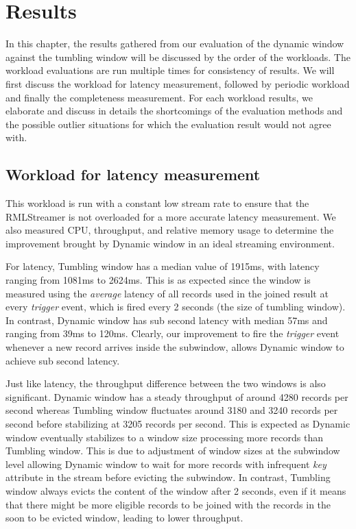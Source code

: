 \chapter{Results}%
\label{chap:Results}

In this chapter, the results gathered from our evaluation of the dynamic window against 
the tumbling window will be discussed by the order of the workloads. The workload 
evaluations are run multiple times for consistency of results. We will first 
discuss the workload for latency measurement, followed by periodic workload and 
finally the completeness measurement. For each workload results, we elaborate 
and discuss in details the shortcomings of the evaluation methods and the 
possible outlier situations for which the evaluation result would not agree with.



\section{Workload for latency measurement}%
\label{sec:Results Workload for latency measurement}

This workload is run with a constant low stream rate to ensure that 
the RMLStreamer is not overloaded for a more accurate latency measurement. We also measured 
CPU, throughput, and relative memory usage to determine the improvement brought by Dynamic window
in an ideal streaming environment.

For latency, Tumbling window has a median value of 1915ms, with latency ranging from 1081ms to 2624ms. 
This is as expected since the window is measured using the \emph{average} latency of all records used 
in the joined result at every \emph{trigger} event, which is fired every 2 seconds (the size of tumbling window).
In contrast, Dynamic window has sub second latency with median 57ms and ranging from 39ms to 120ms. Clearly, 
our improvement to fire the \emph{trigger} event whenever a new record arrives inside the subwindow, allows 
Dynamic window to achieve sub second latency. 

Just like latency, the throughput difference between the two windows is also significant. Dynamic window has a 
steady throughput of around 4280 records per second whereas Tumbling window fluctuates around 
3180 and 3240 records per second before stabilizing at 3205 records per second. This is expected as Dynamic 
window eventually stabilizes to a window size processing more records than Tumbling window. This is 
due to adjustment of window sizes at the subwindow level allowing Dynamic window to wait for more records 
with infrequent \emph{key} attribute in the stream before evicting the subwindow. In contrast, Tumbling window 
always evicts the content of the window after 2 seconds, even if it means that there might be more 
eligible records to be joined with the records in the soon to be evicted window, leading to lower throughput.  

